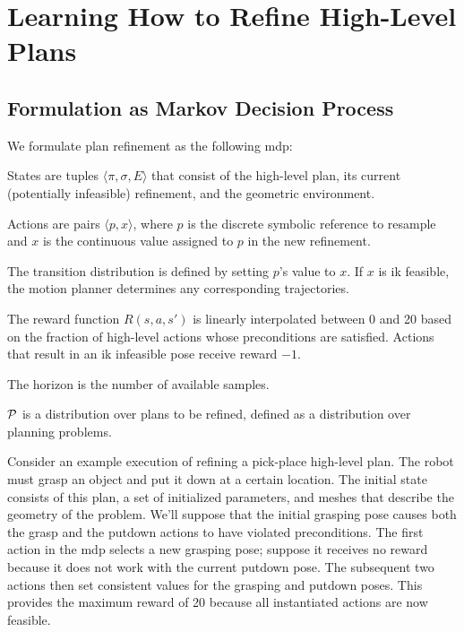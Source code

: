 \section{Learning How to Refine High-Level Plans}

\subsection{Formulation as Markov Decision Process}
We formulate plan refinement as the following {\sc mdp}:
\begin{tightlist}
\item States are tuples $\langle \pi, \sigma, E \rangle$ that consist of the
high-level plan, its current (potentially infeasible) refinement, and the
geometric environment.
\item Actions are pairs $\langle p, x \rangle$, where $p$ is the discrete symbolic
reference to resample and $x$ is the continuous value assigned to $p$ in the new refinement.
\item The transition distribution is defined by setting $p$'s value
  to $x$. If $x$ is {\sc ik} feasible, the motion planner determines
  any corresponding trajectories.
\item The reward function $R(s, a, s')$ is linearly interpolated
  between 0 and 20 based on the fraction of high-level actions whose
  preconditions are satisfied. Actions that result in an {\sc ik}
  infeasible pose receive reward $-1$.
\item The horizon is the number of available samples.
\item $\mathcal{P}$ is a distribution over plans to be refined, defined as a
  distribution over planning problems.
\end{tightlist}

Consider an example execution of refining a pick-place high-level plan. The
robot must grasp an object and put it down at a certain location. The
initial state consists of this plan, a set of initialized parameters,
and meshes that describe the geometry of the problem. We'll suppose
that the initial grasping pose causes both the grasp and the putdown
actions to have violated preconditions. The first action in the {\sc mdp} selects a new grasping pose;
suppose it receives no reward because it does not work with the current putdown pose. The subsequent
two actions then set consistent values for the grasping and putdown poses. This provides
the maximum reward of 20 because all instantiated actions are now feasible.

